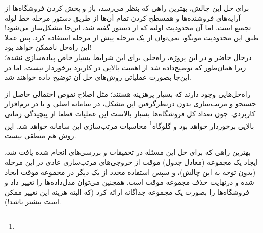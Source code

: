 برای حل این چالش، بهترین راهی که بنظر می‌رسد، باز و پخش کردن فروشگاه‌ها از آرایه‌های فروشنده‌ها و همسطح کردن تمام آن‌ها از طریق دستور مرحله خط لوله تجمیع  است. اما آن محدودیت اولیه که از دستور  گفته شد، این‌جا مشکل‌ساز می‌شود! طبق این محدودیت مونگو،‌ نمی‌توان از یک مرحله  پیش از مرحله  استفاده کرد. پس عملا این راه‌حل ناممکن خواهد بود!\cite{mongo:geostack}\\

درحال حاضر و در این پروژه، راه‌حلی برای این شرایط بسیار خاص پیاده‌سازی نشده؛ زیرا همان‌طور که توضیح‌داده شد از اهمیت بالایی در کاربرد برخوردار نیست، اما در این‌جا بصورت عملیاتی روش‌های حل آن توضیح داده خواهند شد.

راه‌حل‌هایی وجود دارند که بسیار پرهزینه هستند؛ مثل اصلاح نقوص احتمالی حاصل از جستجو و مرتب‌سازی بدون درنظرگرفتن این مشکل، در سامانه اصلی و یا در نرم‌افزار کاربردی. چون تعداد کل فروشگاه‌ها بسیار بالاست این عملیات قطعا از پیچیدگی زمانی بالایی برخوردار خواهد بود و گلوگاه\footnote{} محاسبات مرتب‌سازی این سامانه خواهد شد. این روش هم منطقی نیست.

بهترین راهی که برای حل این مسئله در تحقیقات و بررسی‌های انجام شده یافت شد، ایجاد یک مجموعه (معادل جدول) موقت از خروجی‌های مرتب‌سازی عادی در این مرحله (بدون توجه به این چالش)، و سپس استفاده مجدد از یک  دیگر در مجموعه موقت ایجاد شده و درنهایت حذف مجموعه موقت است. همچنین می‌توان مدل‌داده‌ها را تغییر داد و فروشگاه‌ها را بصورت یک مجموعه جداگانه ارائه کرد (که البته هزینه این تغییر ممکن است بیشتر باشد!).


